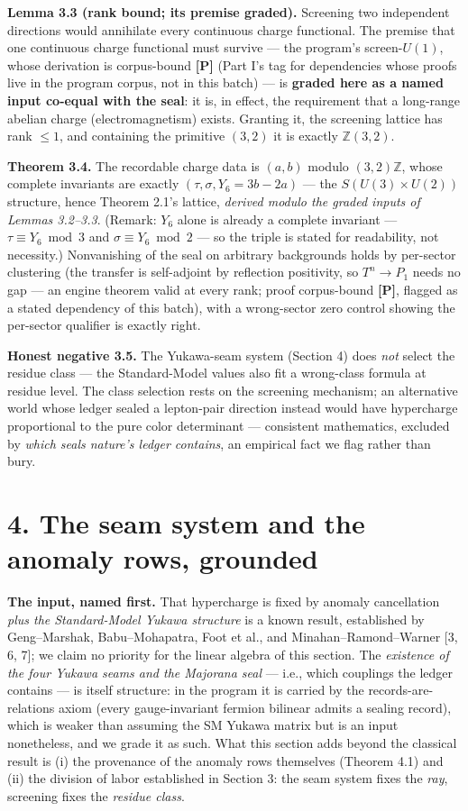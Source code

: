 \documentclass[11pt]{article}
\begin{document}
\textbf{Lemma 3.3 (rank bound; its premise graded).}  Screening two independent directions would annihilate every continuous charge functional.  The premise that one continuous charge functional must survive — the program's screen-$U(1)$, whose derivation is corpus-bound \textbf{[P]} (Part I's tag for dependencies whose proofs live in the program corpus, not in this batch) — is \textbf{graded here as a named input co-equal with the seal}: it is, in effect, the requirement that a long-range abelian charge (electromagnetism) exists.  Granting it, the screening lattice has rank $\le 1$, and containing the primitive $(3,2)$ it is exactly $\mathbb Z(3,2)$.

\textbf{Theorem 3.4.}  The recordable charge data is $(a,b)$ modulo $(3,2)\mathbb Z$, whose complete invariants are exactly $(\tau, \sigma, Y_6 = 3b - 2a)$ — the $S(U(3)\times U(2))$ structure, hence Theorem 2.1's lattice, \emph{derived modulo the graded inputs of Lemmas 3.2–3.3}.  (Remark: $Y_6$ alone is already a complete invariant — $\tau \equiv Y_6 \bmod 3$ and $\sigma \equiv Y_6 \bmod 2$ — so the triple is stated for readability, not necessity.)  Nonvanishing of the seal on arbitrary backgrounds holds by per-sector clustering (the transfer is self-adjoint by reflection positivity, so $T^n \to P_1$ needs no gap — an engine theorem valid at every rank; proof corpus-bound \textbf{[P]}, flagged as a stated dependency of this batch), with a wrong-sector zero control showing the per-sector qualifier is exactly right.

\textbf{Honest negative 3.5.}  The Yukawa-seam system (Section 4) does \emph{not} select the residue class — the Standard-Model values also fit a wrong-class formula at residue level.  The class selection rests on the screening mechanism; an alternative world whose ledger sealed a lepton-pair direction instead would have hypercharge proportional to the pure color determinant — consistent mathematics, excluded by \emph{which seals nature's ledger contains}, an empirical fact we flag rather than bury.

\section*{4. The seam system and the anomaly rows, grounded}
\textbf{The input, named first.}  That hypercharge is fixed by anomaly cancellation \emph{plus the Standard-Model Yukawa structure} is a known result, established by Geng–Marshak, Babu–Mohapatra, Foot et al., and Minahan–Ramond–Warner [3, 6, 7]; we claim no priority for the linear algebra of this section.  The \emph{existence of the four Yukawa seams and the Majorana seal} — i.e., which couplings the ledger contains — is itself structure: in the program it is carried by the records-are-relations axiom (every gauge-invariant fermion bilinear admits a sealing record), which is weaker than assuming the SM Yukawa matrix but is an input nonetheless, and we grade it as such. What this section adds beyond the classical result is (i) the provenance of the anomaly rows themselves (Theorem 4.1) and (ii) the division of labor established in Section 3: the seam system fixes the \emph{ray}, screening fixes the \emph{residue class}.
\end{document}
